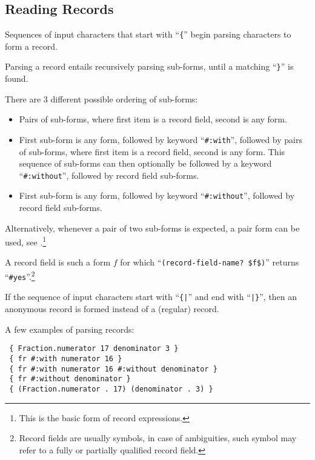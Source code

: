 \subsection{Reading Records}
\label{subsec:aml-base-lang-reader-records}

Sequences of input characters that start with ``\lstinline!{!'' begin parsing characters to form a record.

Parsing a record entails recursively parsing sub-forms, until a matching ``\lstinline!}!'' is found. 

There are 3 different possible ordering of sub-forms:
\begin{itemize}
  \item Pairs of sub-forms, where first item is a record field, second is any form.
  \item First sub-form is any form, followed by keyword ``\lstinline!#:with!'', followed by pairs of sub-forms, where first item is a record field, second is any form. This sequence of sub-forms can then optionally be followed by a keyword ``\lstinline!#:without!'', followed by record field sub-forms.
  \item First sub-form is any form, followed by keyword ``\lstinline!#:without!'', followed by record field sub-forms.
\end{itemize}

Alternatively, whenever a pair of two sub-forms is expected, a pair form can be used, see .\footnote{This is the basic form of record expressions.}

A record field is such a form $f$ for which ``\lstinline!(record-field-name? $f$)!'' returns ``\lstinline!#yes!''.\footnote{Record fields are usually symbols, in case of ambiguities, such symbol may refer to a fully or partially qualified record field.}

If the sequence of input characters start with ``\lstinline!{|!'' and end with ``\lstinline!|}!'', then an anonymous record is formed instead of a (regular) record.

\example A few examples of parsing records:

\begin{lstlisting}
 { Fraction.numerator 17 denominator 3 }
 { fr #:with numerator 16 }
 { fr #:with numerator 16 #:without denominator }
 { fr #:without denominator }
 { (Fraction.numerator . 17) (denominator . 3) }
\end{lstlisting}






